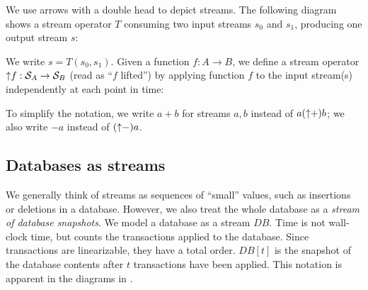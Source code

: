 We use arrows with a double head to depict streams.  The following
diagram shows a stream operator $T$ consuming two input streams $s_0$
and $s_1$, producing one output stream $s$:
%
\begin{center}
\vspace{-1ex}
\end{center}
%
We write $s = T(s_0, s_1)$.
Given a function $f: A \to B$, we define a stream operator ${\uparrow}f
:\mathcal{S}_{A} \to \mathcal{S}_{B}$ (read as ``$f$ lifted'') by applying
function $f$ to the input stream(s) independently at each point in
time:
\begin{center}
\end{center}
\vspace{-1ex}

To simplify the notation, we write $a + b$ for streams $a, b$ instead
of $a ({\uparrow}+) b$; we also write $-a$ instead of $({\uparrow}-)a$.

\subsection{Databases as streams}

We generally think of streams as sequences of ``small'' values, such
as insertions or deletions in a database.  However, we also treat the
whole database as a \emph{stream of database snapshots}.  We model a
database as a stream $DB$.  Time is not wall-clock time, but counts
the transactions applied to the database.  Since transactions are
linearizable, they have a total order.  $DB[t]$ is the snapshot of the
database contents after $t$ transactions have been applied.  This
notation is apparent in the diagrams in .

